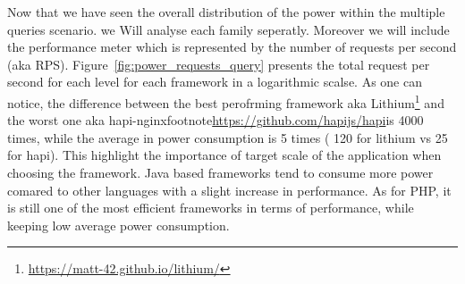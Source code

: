 \begin{table}[bth]
    \raggedright
    \caption{Average power consumption of frameworks based on the database type }
    \label{table:query_db_row}
\end{table}

Now that we have seen the overall distribution of the power within the multiple queries scenario. we Will analyse each family seperatly. Moreover we will include the performance meter which is represented by the number of requests per second (aka RPS). Figure~\ref{fig:power_requests_query} presents the total request per second for each level for each framework in a logarithmic scalse. As one can notice, the difference between the best perofrming framework aka Lithium\footnote{\url{https://matt-42.github.io/lithium/}} and the worst one aka hapi-nginxfootnote{\url{https://github.com/hapijs/hapi}}is 4000 times, while the average in power consumption is 5 times ( 120 for lithium vs 25 for hapi). This highlight the importance of target scale of the application when choosing the framework.
Java based frameworks tend to consume more power comared to other languages with a slight increase in performance.
As for PHP, it is still one of the most efficient frameworks in terms of performance, while keeping low average power consumption.


